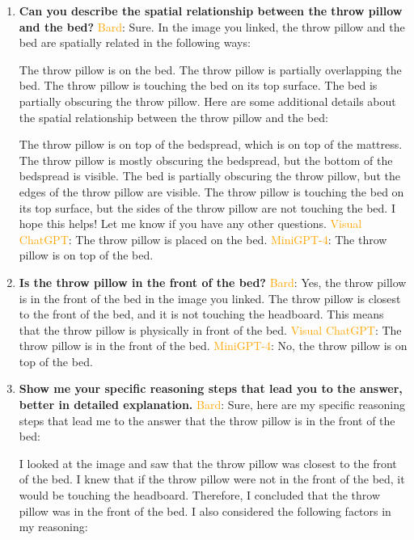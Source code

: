     \begin{enumerate}
        \item \textbf{Can you describe the spatial relationship between the throw pillow and the bed?}
        \subitem \textcolor{orange}{Bard}:
        Sure. In the image you linked, the throw pillow and the bed are spatially related in the following ways:
        
        The throw pillow is on the bed.
        The throw pillow is partially overlapping the bed.
        The throw pillow is touching the bed on its top surface.
        The bed is partially obscuring the throw pillow.
        Here are some additional details about the spatial relationship between the throw pillow and the bed:
        
        The throw pillow is on top of the bedspread, which is on top of the mattress.
        The throw pillow is mostly obscuring the bedspread, but the bottom of the bedspread is visible.
        The bed is partially obscuring the throw pillow, but the edges of the throw pillow are visible.
        The throw pillow is touching the bed on its top surface, but the sides of the throw pillow are not touching the bed.
        I hope this helps! Let me know if you have any other questions.
        \subitem \textcolor{orange}{Visual ChatGPT}: The throw pillow is placed on the bed.
        \subitem \textcolor{orange}{MiniGPT-4}: The throw pillow is on top of the bed.
        \item \textbf{Is the throw pillow in the front of the bed?} 
        \subitem \textcolor{orange}{Bard}: 
        Yes, the throw pillow is in the front of the bed in the image you linked. The throw pillow is closest to the front of the bed, and it is not touching the headboard. This means that the throw pillow is physically in front of the bed. 
        \subitem \textcolor{orange}{Visual ChatGPT}: The throw pillow is in the front of the bed.
        \subitem \textcolor{orange}{MiniGPT-4}: No, the throw pillow is on top of the bed.
        \item \textbf{Show me your specific reasoning steps that lead you to the answer, better in detailed explanation.}
        \subitem \textcolor{orange}{Bard}: Sure, here are my specific reasoning steps that lead me to the answer that the throw pillow is in the front of the bed:

        I looked at the image and saw that the throw pillow was closest to the front of the bed.
        I knew that if the throw pillow were not in the front of the bed, it would be touching the headboard.
        Therefore, I concluded that the throw pillow was in the front of the bed.
        I also considered the following factors in my reasoning:
        

\end{enumerate}
